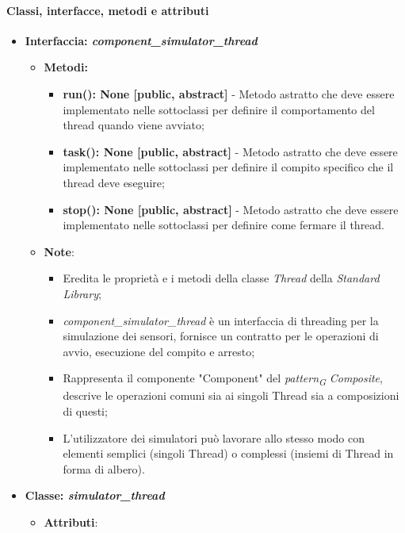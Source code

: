 \paragraph{Classi, interfacce, metodi e attributi}

\begin{itemize}
    \item{\textbf{Interfaccia: \textit{component\_simulator\_thread}}}
    \begin{itemize}
        \item \textbf{Metodi:}
        \begin{itemize}
            \item \textbf{run(): None [public, abstract]} - Metodo astratto che deve essere implementato nelle sottoclassi per definire il comportamento del thread quando viene avviato;
            \item \textbf{task(): None [public, abstract]} - Metodo astratto che deve essere implementato nelle sottoclassi per definire il compito specifico che il thread deve eseguire;
            \item \textbf{stop(): None [public, abstract]} - Metodo astratto che deve essere implementato nelle sottoclassi per definire come fermare il thread.
        \end{itemize}
        \item\textbf{Note}:
        \begin{itemize}
            \item Eredita le proprietà e i metodi della classe \textit{Thread} della \textit{Standard Library};
            \item \textit{component\_simulator\_thread} è un interfaccia di threading per la simulazione dei sensori, fornisce un contratto per le operazioni di avvio, esecuzione del compito e arresto;
            \item Rappresenta il componente "Component" del \textit{pattern}\textsubscript{\textit{G}} \textit{Composite}, descrive le operazioni comuni sia ai singoli Thread sia a composizioni di questi;
            \item L'utilizzatore dei simulatori può lavorare allo stesso modo con elementi semplici (singoli Thread) o complessi (insiemi di Thread in forma di albero).
        \end{itemize}
    \end{itemize}
    \item{\textbf{Classe: \textit{simulator\_thread}}}
    \begin{itemize}
        \item\textbf{Attributi}:

\end{itemize}
\end{itemize}
